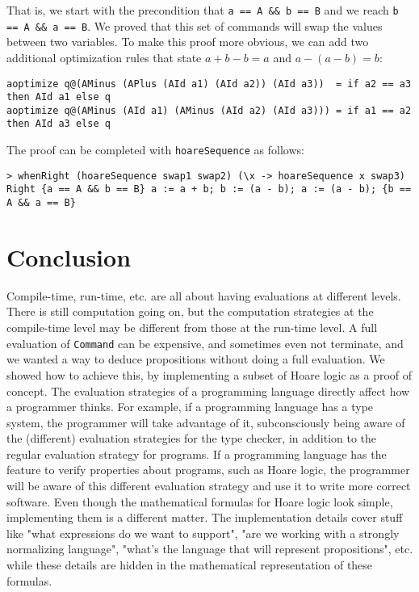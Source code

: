 \documentclass{article}
\begin{document}
That is, we start with the precondition that \texttt{a == A \&\& b == B} and we reach \texttt{b == A \&\& a == B}. We proved that this set of commands will swap the values between two variables. To make this proof more obvious, we can add two additional optimization rules that state $a + b - b = a$ and $a - (a - b) = b$:

\begin{lstlisting}
aoptimize q@(AMinus (APlus (AId a1) (AId a2)) (AId a3))  = if a2 == a3 then AId a1 else q
aoptimize q@(AMinus (AId a1) (AMinus (AId a2) (AId a3))) = if a1 == a2 then AId a3 else q
\end{lstlisting}

The proof can be completed with \texttt{hoareSequence} as follows:

\begin{lstlisting}
> whenRight (hoareSequence swap1 swap2) (\x -> hoareSequence x swap3)
Right {a == A && b == B} a := a + b; b := (a - b); a := (a - b); {b == A && a == B}
\end{lstlisting}

\section{Conclusion}

Compile-time, run-time, etc. are all about having evaluations at different levels. There is still computation going on, but the computation strategies at the compile-time level may be different from those at the run-time level. A full evaluation of \texttt{Command} can be expensive, and sometimes even not terminate, and we wanted a way to deduce propositions without doing a full evaluation. We showed how to achieve this, by implementing a subset of Hoare logic as a proof of concept. The evaluation strategies of a programming language directly affect how a programmer thinks. For example, if a programming language has a type system, the programmer will take advantage of it, subconsciously being aware of the (different) evaluation strategies for the type checker, in addition to the regular evaluation strategy for programs. If a programming language has the feature to verify properties about programs, such as Hoare logic, the programmer will be aware of this different evaluation strategy and use it to write more correct software. Even though the mathematical formulas for Hoare logic look simple, implementing them is a different matter. The implementation details cover stuff like "what expressions do we want to support", "are we working with a strongly normalizing language", "what's the language that will represent propositions", etc. while these details are hidden in the mathematical representation of these formulas.
\end{document}
